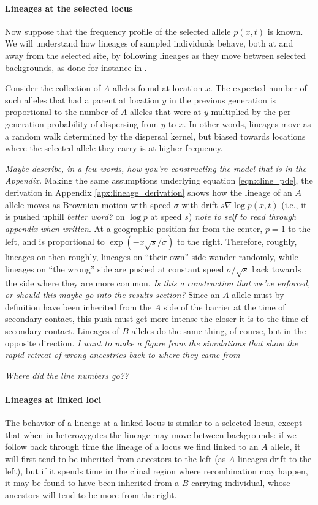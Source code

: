 \documentclass[12pt]{article}
\newcommand{\alisa}[1]{{\em \color{red} #1}}
\newcommand{\grad}{\nabla}
\begin{document}
\paragraph{Lineages at the selected locus}
Now suppose that the frequency profile of the selected allele $p(x,t)$ is known.
We will understand how lineages of sampled individuals behave,
both at and away from the selected site,
by following lineages as they move between selected backgrounds,
as done for instance in \citet{selectioncoal,Ralph2015}.


Consider the collection of $A$ alleles found at location $x$.
The expected number of such alleles that had a parent at location $y$ in the previous generation is proportional to the number of  $A$ alleles that were at $y$ multiplied by the per-generation probability of dispersing from $y$ to $x$. In other words, lineages move as a random walk determined by the dispersal kernel,
but biased towards locations where the selected allele they carry is at higher frequency.

\alisa{Maybe describe, in a few words, how you're constructing the model that is in the Appendix.}
Making the same assumptions underlying equation \eqref{eqn:cline_pde}, the derivation in Appendix \ref{apx:lineage_derivation} shows 
how the lineage of an $A$ allele moves as Brownian motion with speed $\sigma$
with drift $s \grad \log p(x,t)$ (i.e., it is pushed uphill \alisa{better word?} on $\log p$ at speed $s$) \alisa{note to self to read through appendix when written}.
At a geographic position far from the center, $p=1$ to the left, and is proportional to  $\exp(-x\sqrt{s}/\sigma)$ to the right.
Therefore, roughly, lineages on 
then roughly, lineages on ``their own'' side wander randomly,
while lineages on ``the wrong'' side are pushed at constant speed $\sigma/\sqrt{s}$ 
back towards the side where they are more common. \alisa{Is this a construction that we've enforced, or should this maybe go into the results section?}
Since an $A$ allele must by definition have been inherited from the $A$ side of the barrier 
at the time of secondary contact, this push must get more intense the closer it is to the time of secondary contact.
Lineages of $B$ alleles do the same thing, of course, but in the opposite direction. \alisa{I want to make a figure from the simulations that show the rapid retreat of wrong ancestries back to where they came from}



\alisa{Where did the line numbers go??}
\paragraph{Lineages at linked loci}
The behavior of a lineage at a linked locus is similar to a selected locus,
except that when in heterozygotes the lineage may move between backgrounds:
if we follow back through time the lineage of a locus we find linked to an $A$ allele, 
it will first tend to be inherited from ancestors to the left (as $A$ lineages drift to the left),
but if it spends time in the clinal region where recombination may happen,
it may be found to have been inherited from a $B$-carrying individual,
whose ancestors will tend to be more from the right.
\end{document}
